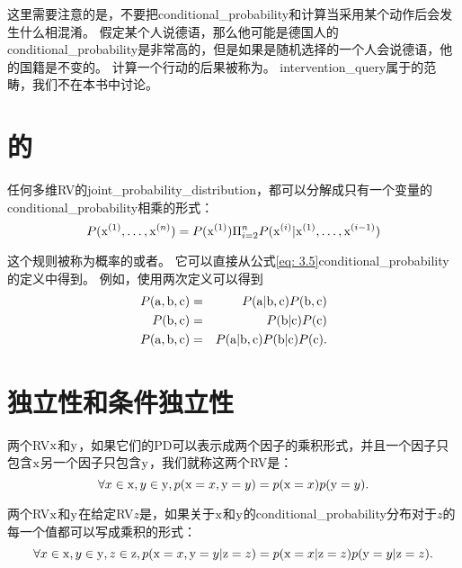 这里需要注意的是，不要把\gls{conditional_probability}和计算当采用某个动作后会发生什么相混淆。
假定某个人说德语，那么他可能是德国人的\gls{conditional_probability}是非常高的，但是如果是随机选择的一个人会说德语，他的国籍是不变的。
计算一个行动的后果被称为。
\gls{intervention_query}属于的范畴，我们不在本书中讨论。

\section{的}
\label{sec:the_chain_rule_of_conditional_probabilities}

任何多维\gls{RV}的\gls{joint_probability_distribution}，都可以分解成只有一个变量的\gls{conditional_probability}相乘的形式：
\begin{equation}
P(\mathrm{x}^{(1)}, \ldots, \mathrm{x}^{(n)}) = P(\mathrm{x}^{(1)}) \Pi_{i=2}^n P(\mathrm{x}^{(i)} | \mathrm{x}^{(1)}, \ldots, \mathrm{x}^{(i-1)})
\end{equation}


这个规则被称为概率的或者。
它可以直接从公式\ref{eq: 3.5}\gls{conditional_probability}的定义中得到。
例如，使用两次定义可以得到
\begin{eqnarray*}
P(\mathrm{a}, \mathrm{b}, \mathrm{c}) &=& P(\mathrm{a} | \mathrm{b}, \mathrm{c}) P(\mathrm{b}, \mathrm{c})\\
P(\mathrm{b}, \mathrm{c}) &=& P(\mathrm{b} | \mathrm{c}) P(\mathrm{c})\\
P(\mathrm{a}, \mathrm{b}, \mathrm{c}) &=& P(\mathrm{a} | \mathrm{b}, \mathrm{c}) P(\mathrm{b} | \mathrm{c}) P(\mathrm{c}).
\end{eqnarray*}

\section{独立性和条件独立性}
\label{sec:independence_and_conditional_independence}

两个\gls{RV}$\mathrm{x}$和$\mathrm{y}$，如果它们的\gls{PD}可以表示成两个因子的乘积形式，并且一个因子只包含$\mathrm{x}$另一个因子只包含$\mathrm{y}$，我们就称这两个\gls{RV}是：
\begin{equation}
\forall x \in \mathrm{x}, y \in \mathrm{y}, p(\mathrm{x} = x, \mathrm{y} = y) = p(\mathrm{x} = x)p(\mathrm{y} = y).
\end{equation}

两个\gls{RV}$\mathrm{x}$和$\mathrm{y}$在给定\gls{RV}$z$是，如果关于$\mathrm{x}$和$\mathrm{y}$的\gls{conditional_probability}分布对于$z$的每一个值都可以写成乘积的形式：
\begin{equation}
\forall x \in \mathrm{x}, y \in \mathrm{y}, z \in \mathrm{z}, p( \mathrm{x}=x, \mathrm{y}=y | \mathrm{z}=z) =
p(\mathrm{x} = x | \mathrm{z} = z) p(\mathrm{y} = y | \mathrm{z} = z).
\end{equation}

